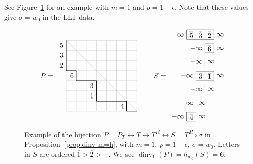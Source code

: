 \documentclass[12pt]{amsart}
\theoremstyle{definition}
\theoremstyle{remark}
\DeclareMathOperator{\dinv}{dinv}
\begin{document}
See Figure~\ref{fig:PF} for an example with $m=1$ and $p=1-\epsilon$.
Note that these values give $\sigma = w_0$ in the LLT data.

\begin{figure}
\[
\begin{tikzpicture}[scale = 0.5,baseline=1.75cm]
\draw [black!25] (0,0) grid (7,7);
\draw [black!25] (0,7)--(7,0);
\draw [thick] (0,7)--(0,4)--(1,4)--(1,3)--(3,3)--(3,1)--(6,1)--(6,0)--(7,0);
\node [left] at (0,6.5) {$5$};
\node [left] at (0,5.5) {$3$};
\node [left] at (0,4.5) {$2$};
\node [left] at (1,3.5) {$6$};
\node [left] at (3,2.5) {$3$};
\node [left] at (3,1.5) {$1$};
\node [left] at (6,0.5) {$4$};
\node [left] at (-1,3.5) {$P = $};
\end{tikzpicture}
\qquad 
\begin{tikzpicture}[scale=.45,baseline=2.25cm]
\draw (0,0) grid (1,1);
\node [left] at (0,.5) {$-\infty $};
\node at (.5,.5) {$\overline{4}$};
\node [right] at (1,.5) {$\infty $};

\draw (1,1.5) -- (1,2.5);
\node [left] at (1,2) {$-\infty $};
\node [right] at (1,2) {$\infty $};

\draw (2,3) -- (2,4);
\node [left] at (2,3.5) {$-\infty $};
\node [right] at (2,3.5) {$\infty $};

\draw [yshift=4.5cm] (1,0) grid (3,1);
\node [left] at (1,5) {$-\infty $};
\node at (1.5,5) {$\overline{3}$};
\node at (2.5,5) {$\overline{1}$};
\node [right] at (3,5) {$\infty $};

\draw (2,6) -- (2,7);
\node [left] at (2,6.5) {$-\infty $};
\node [right] at (2,6.5) {$\infty $};

\draw [yshift=7.5cm] (2,0) grid (3,1);
\node [left] at (2,8) {$-\infty $};
\node at (2.5,8) {$\overline{6}$};
\node [right] at (3,8) {$\infty $};

\draw [yshift=9cm] (0,0) grid (3,1);
\node [left] at (0,9.5) {$-\infty $};
\node at (.5,9.5) {$\overline{5}$};
\node at (1.5,9.5) {$\overline{3}$};
\node at (2.5,9.5) {$\overline{2}$};
\node [right] at (3,9.5) {$\infty $};

\node [left] at (-2,5) {$S = $};
\end{tikzpicture}
\]
\caption{\label{fig:PF}
Example of the bijection $P=P_T\leftrightarrow T\leftrightarrow
T^R\leftrightarrow S=T^R\circ \sigma$ in
Proposition~\ref{prop:dinv-m=h}, with $m=1$, $p=1-\epsilon$, $\sigma =
w_0$.  Letters in $S$ are ordered $\overline{1} > \overline{2} >
\cdots$.  We see $\dinv_1(P) = h_{w_0}(S) = 6$.}
\end{figure}
\end{document}
